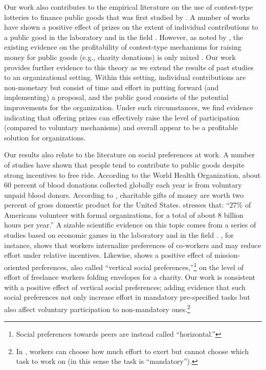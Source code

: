 \documentclass[12pt, titlepage]{article}
\begin{document}
Our work also contributes to the empirical literature on the use of
contest-type lotteries to finance public goods that was first studied by
\citet{morgan2000financing}. A number of works have shown a positive
effect of prizes on the extent of individual contributions to a public
good in the laboratory
\citep{morgan2000funding, dale2004charitable, lange2007using} and in the
field \citep{landry2006toward}. However, as noted by
\citet{vesterlund2012voluntary}, the existing evidence on the
profitability of contest-type mechanisms for raising money for public
goods (e.g., charity donations) is only mixed
\citep{vesterlund2012voluntary}. Our work provides further evidence to
this theory as we extend the results of past studies to an
organizational setting. Within this setting, individual contributions
are non-monetary but consist of time and effort in putting forward (and
implementing) a proposal, and the public good consists of the potential
improvements for the organization. Under such circumstances, we find
evidence indicating that offering prizes can effectively raise the level
of participation (compared to voluntary mechanisms) and overall appear
to be a profitable solution for organizations.

Our results also relate to the literature on social preferences at work.
A number of studies have shown that people tend to contribute to public
goods despite strong incentives to free ride. According to the World
Health Organization, about 60 percent of blood donations collected
globally each year is from voluntary unpaid blood donors. According to
\citet{list2011market}, charitable gifts of money are worth two percent
of gross domestic product for the United States.
\citet{lacetera2014rewarding} stresses that: ``27\% of Americans
volunteer with formal organizations, for a total of about 8 billion
hours per year.'' A sizable scientific evidence on this topic comes from
a series of studies based on economic games in the laboratory
\citep[see][ for a review]{levitt2007laboratory} and in the field
\citep{bandiera2005social, dellavigna2016estimating}.
\citet{bandiera2005social}, for instance, shows that workers internalize
preferences of co-workers and may reduce effort under relative
incentives. Likewise, \citet{dellavigna2016estimating} shows a positive
effect of mission-oriented preferences, also called ``vertical social
preferences,''\footnote{Social preferences towards peers are instead
  called ``horizontal.''} on the level of effort of freelance workers
folding envelopes for a charity. Our work is consistent with a positive
effect of vertical social preferences; adding evidence that such social
preferences not only increase effort in mandatory pre-specified tasks
but also affect voluntary participation to non-mandatory ones.\footnote{In
  \citet{dellavigna2016estimating}, workers can choose how much effort
  to exert but cannot choose which task to work on (in this sense the
  task is ``mandatory'').}
\end{document}
